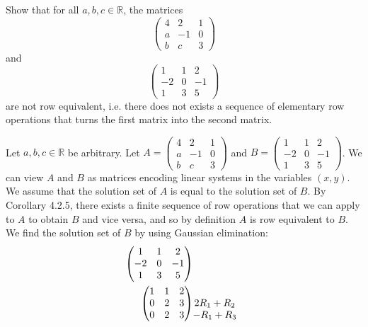 \documentclass[12pt]{article}
\newenvironment{problem}[2][Problem]
{
	\begin{trivlist} 
		\item[\hskip \labelsep {\bfseries #1 #2:}]
	}
{
	\end{trivlist}
	}
\newenvironment{solution}[1][Solution]
{
	\begin{trivlist} 
		\item[\hskip \labelsep {\itshape #1:}]
	}
	{
	\end{trivlist}
}
\begin{document}
\newpage
\begin{problem}{2}
Show that for all $a,b,c \in \mathbb{R}$, the matrices
\[
\begin{pmatrix}4&2&1\\a&-1&0\\b&c&3 \end{pmatrix}
\]
and
\[
\begin{pmatrix} 1&1&2\\-2&0&-1\\1&3&5 \end{pmatrix}
\]
are not row equivalent, i.e. there does not exists a sequence of elementary row operations that turns the first matrix into the second matrix.
\noindent
\newline
\newline
\begin{solution}
Let $a,b,c\in \mathbb{R}$ be arbitrary. Let $A=\begin{pmatrix}4&2&1\\a&-1&0\\b&c&3 \end{pmatrix}$ and $B=\begin{pmatrix} 1&1&2\\-2&0&-1\\1&3&5 \end{pmatrix}$. We can view $A$ and $B$ as matrices encoding linear systems in the variables $(x,y)$. We assume that the solution set of $A$ is equal to the solution set of $B$. By Corollary 4.2.5, there exists a finite sequence of row operations that we can apply to $A$ to obtain $B$ and vice versa, and so by definition $A$ is row equivalent to $B$. We find the solution set of $B$ by using Gaussian elimination:
\begin{align*}
\begin{pmatrix} 1&1&2\\-2&0&-1\\1&3&5 \end{pmatrix}
&\begin{matrix} \hphantom{1}\\ \hphantom{1}\\  \hphantom{1}\end{matrix}\\
\begin{pmatrix} 1&1&2\\0&2&3\\0&2&3 \end{pmatrix}
&\begin{matrix} \hphantom{1}\\ 2R_1 + R_2\hphantom{1}\\ -R_1+R_3 \hphantom{1}\end{matrix}\\

\end{align*}
\end{solution}
\end{problem}
\end{document}
